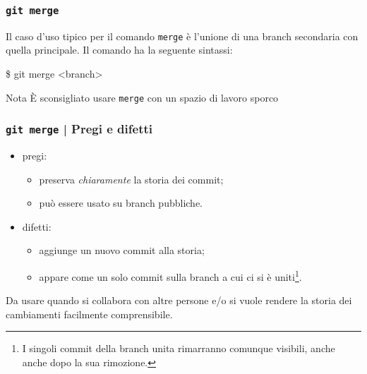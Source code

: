\documentclass{beamer}
\begin{document}
\begin{frame}
  \frametitle{\texttt{git merge}}
  Il caso d'uso tipico per il comando \texttt{merge} \`e l'unione di una branch
  secondaria con quella principale. Il comando ha la seguente sintassi:
  \begin{semiverbatim}
  \$ git merge <branch>
  \end{semiverbatim}

  \begin{figure}
  \end{figure}

  \pause
  \begin{block}{Nota}
    \`E sconsigliato usare \texttt{merge} con un spazio di lavoro sporco
  \end{block}
\end{frame}

\begin{frame}
  \frametitle{\texttt{git merge} | Pregi e difetti}
  \begin{itemize}
    \item pregi: \begin{itemize}
      \item preserva \emph{chiaramente} la storia dei commit;
      \item pu\`o essere usato su branch pubbliche.
    \end{itemize}
    \item difetti: \begin{itemize}
      \item aggiunge un nuovo commit alla storia;
      \item appare come un solo commit sulla branch a cui ci si \`e uniti\footnote{
          I singoli commit della branch unita rimarranno comunque visibili, anche
          anche dopo la sua rimozione.
        }.
    \end{itemize}
  \end{itemize}

  Da usare quando si collabora con altre persone e/o si vuole rendere la storia
  dei cambiamenti facilmente comprensibile.
\end{frame}
\end{document}
